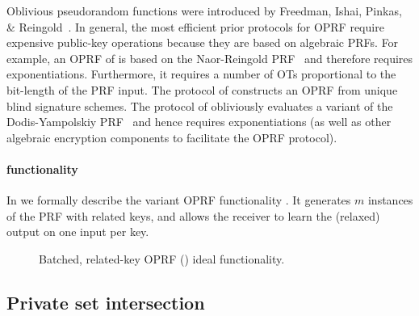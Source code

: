 Oblivious pseudorandom functions were introduced by Freedman, Ishai, Pinkas, \& Reingold~\cite{TCC:FIPR05}. In general, the most efficient prior protocols for OPRF require expensive public-key operations because they are based on algebraic PRFs.
For example, an OPRF of \cite{TCC:FIPR05} is based on the Naor-Reingold PRF~\cite{NaoRei04} and therefore requires exponentiations. Furthermore, it requires a number of OTs proportional to the bit-length of the PRF input. 
The protocol of \cite{EC:CamNevShe07} constructs an OPRF from unique blind signature schemes.
The protocol of \cite{TCC:JarLiu09} obliviously evaluates a variant of the Dodis-Yampolskiy PRF~\cite{PKC:DodYam05} and hence requires exponentiations (as well as other algebraic encryption components to facilitate the OPRF protocol).

\paragraph{\batchOPRF functionality}


In  we formally describe the variant OPRF functionality \cite{CCS:KKRT16}. It generates $m$ instances of the PRF with related keys, and allows the receiver to learn the (relaxed) output on one input per key.

\begin{figure}[htb]\centering
{}
\caption{Batched, related-key OPRF (\batchOPRF) ideal functionality.}
\label{fig:oprf}
\end{figure}

\subsection{Private set intersection}              

